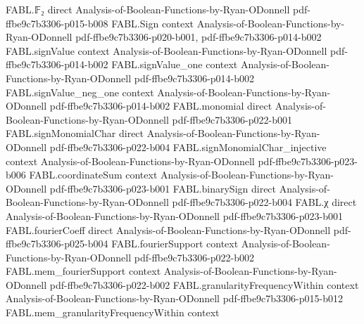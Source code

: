 \begin{theorem}
\label{FABL.vectorFourierCoeff_setIndicator_binaryAffineSubspace_of_not_mem}
\leanok
{}
\proofstep
  {FABL.𝔽₂}
  {direct}
  {Analysis-of-Boolean-Functions-by-Ryan-ODonnell}
  {pdf-ffbe9c7b3306-p015-b008}
\proofstep
  {FABL.Sign}
  {context}
  {Analysis-of-Boolean-Functions-by-Ryan-ODonnell}
  {pdf-ffbe9c7b3306-p020-b001,
    pdf-ffbe9c7b3306-p014-b002}
\proofstep
  {FABL.signValue}
  {context}
  {Analysis-of-Boolean-Functions-by-Ryan-ODonnell}
  {pdf-ffbe9c7b3306-p014-b002}
\proofstep
  {FABL.signValue_one}
  {context}
  {Analysis-of-Boolean-Functions-by-Ryan-ODonnell}
  {pdf-ffbe9c7b3306-p014-b002}
\proofstep
  {FABL.signValue_neg_one}
  {context}
  {Analysis-of-Boolean-Functions-by-Ryan-ODonnell}
  {pdf-ffbe9c7b3306-p014-b002}
\proofstep
  {FABL.monomial}
  {direct}
  {Analysis-of-Boolean-Functions-by-Ryan-ODonnell}
  {pdf-ffbe9c7b3306-p022-b001}
\proofstep
  {FABL.signMonomialChar}
  {direct}
  {Analysis-of-Boolean-Functions-by-Ryan-ODonnell}
  {pdf-ffbe9c7b3306-p022-b004}
\proofstep
  {FABL.signMonomialChar_injective}
  {context}
  {Analysis-of-Boolean-Functions-by-Ryan-ODonnell}
  {pdf-ffbe9c7b3306-p023-b006}
\proofstep
  {FABL.coordinateSum}
  {context}
  {Analysis-of-Boolean-Functions-by-Ryan-ODonnell}
  {pdf-ffbe9c7b3306-p023-b001}
\proofstep
  {FABL.binarySign}
  {direct}
  {Analysis-of-Boolean-Functions-by-Ryan-ODonnell}
  {pdf-ffbe9c7b3306-p022-b004}
\proofstep
  {FABL.χ}
  {direct}
  {Analysis-of-Boolean-Functions-by-Ryan-ODonnell}
  {pdf-ffbe9c7b3306-p023-b001}
\proofstep
  {FABL.fourierCoeff}
  {direct}
  {Analysis-of-Boolean-Functions-by-Ryan-ODonnell}
  {pdf-ffbe9c7b3306-p025-b004}
\proofstep
  {FABL.fourierSupport}
  {context}
  {Analysis-of-Boolean-Functions-by-Ryan-ODonnell}
  {pdf-ffbe9c7b3306-p022-b002}
\proofstep
  {FABL.mem_fourierSupport}
  {context}
  {Analysis-of-Boolean-Functions-by-Ryan-ODonnell}
  {pdf-ffbe9c7b3306-p022-b002}
\proofstep
  {FABL.granularityFrequencyWithin}
  {context}
  {Analysis-of-Boolean-Functions-by-Ryan-ODonnell}
  {pdf-ffbe9c7b3306-p015-b012}
\proofstep
  {FABL.mem_granularityFrequencyWithin}
  {context}

\end{theorem}
